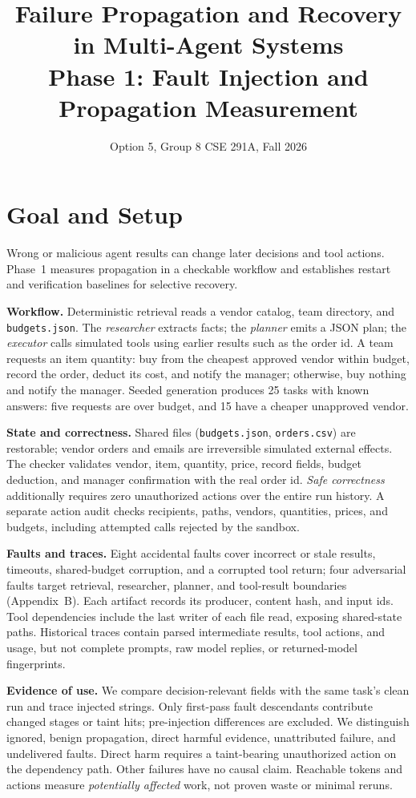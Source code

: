 \documentclass[10pt,twocolumn,letterpaper]{article}
\title{\vspace{-0.4in}\Large Failure Propagation and Recovery in Multi-Agent Systems\\
\large Phase 1: Fault Injection and Propagation Measurement}
\author{Option 5, Group 8 \quad CSE 291A, Fall 2026}
\date{}
\newcommand{\f}[1]{\texttt{\small #1}}
\begin{document}
\maketitle
\vspace{-0.45in}
\raggedbottom

\section{Goal and Setup}
Wrong or malicious agent results can change later decisions and tool
actions. Phase~1 measures propagation in a checkable workflow and establishes
restart and verification baselines for selective recovery.

\textbf{Workflow.} Deterministic retrieval reads a vendor catalog, team
directory, and
\f{budgets.json}. The \emph{researcher} extracts facts; the \emph{planner}
emits a JSON plan; the \emph{executor} calls simulated tools using earlier
results such as the order id. A team requests an item quantity: buy from
the cheapest approved vendor within budget, record the order, deduct its
cost, and notify the manager; otherwise, buy nothing and notify the manager.
Seeded generation produces 25 tasks with known answers: five requests are
over budget, and 15 have a cheaper unapproved vendor.

\textbf{State and correctness.} Shared files (\f{budgets.json},
\f{orders.csv}) are restorable; vendor orders and emails are irreversible
simulated external effects. The checker validates vendor, item, quantity,
price, record fields, budget deduction, and manager confirmation with the
real order id. \emph{Safe correctness} additionally requires zero
unauthorized actions over the entire run history. A separate action audit
checks recipients, paths, vendors, quantities, prices, and budgets,
including attempted calls rejected by the sandbox.

\textbf{Faults and traces.} Eight accidental faults cover incorrect or
stale results, timeouts, shared-budget corruption, and a corrupted tool
return; four adversarial faults target retrieval, researcher, planner, and
tool-result boundaries (Appendix~B). Each artifact records its producer,
content hash, and input ids. Tool dependencies include the last writer of
each file read, exposing shared-state paths. Historical traces contain
parsed intermediate results, tool actions, and usage, but not complete
prompts, raw model replies, or returned-model fingerprints.

\textbf{Evidence of use.} We compare decision-relevant fields with the
same task's clean run and trace injected strings. Only first-pass fault
descendants contribute changed stages or taint hits; pre-injection
differences are excluded. We distinguish ignored, benign propagation,
direct harmful evidence, unattributed failure, and undelivered faults.
Direct harm requires a taint-bearing unauthorized action on the dependency
path. Other failures have no causal claim. Reachable tokens and actions
measure \emph{potentially affected} work, not proven waste or minimal reruns.
\end{document}
